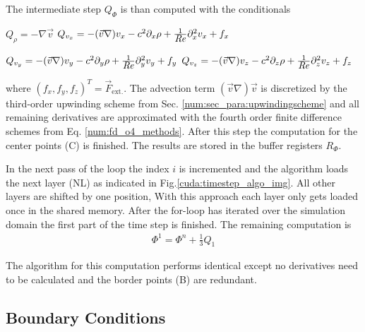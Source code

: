 The intermediate step $Q_{\Phi}$ is than computed with the conditionals
\begin{center}
 \begin{minipage}{.55\linewidth}
\begin{algorithmic}
      \STATE ${Q_{\rho} = -\nabla \vec{v}}$
\ENDIF
{}
      \STATE ${Q_{v_x} = -(\vec{v} \nabla) v_x - c^2\partial_x\rho + \frac{1}{\mbox{\textit{Re}}}\partial^2_xv_x + f_x}$
\ENDIF
\end{algorithmic}
 \end{minipage}

\clearpage

 \begin{minipage}{.55\linewidth}
\begin{algorithmic}
      \STATE ${Q_{v_y} = -(\vec{v} \nabla) v_y - c^2\partial_y\rho + \frac{1}{\mbox{\textit{Re}}}\partial^2_yv_y + f_y}$
\ENDIF
{}
      \STATE ${Q_{v_z} = -(\vec{v} \nabla) v_z - c^2\partial_z\rho + \frac{1}{\mbox{\textit{Re}}}\partial^2_zv_z + f_z}$
\ENDIF
\end{algorithmic}
 \end{minipage}
\end{center}

where $(f_x, f_y, f_z)^T = \vec{F}_{\text{ext.}}$. The advection term $(\vec{v}\nabla)\vec{v}$ is discretized by the third-order upwinding scheme from Sec. \ref{num:sec_para:upwindingscheme}
and all remaining derivatives are approximated with the fourth order finite difference schemes from Eq. \ref{num:fd_o4_methods}.
After this step the computation for the center points (C) is finished.
The results are stored in the buffer registers $R_\Phi$.

In the next pass of the loop the index $i$ is incremented and the algorithm loads the next layer (NL) as indicated in Fig.\ref{cuda:timestep_algo_img}.
All other layers are shifted by one position, With this approach each layer only gets loaded once in the shared memory.
After the for-loop has iterated over the simulation domain the first part of the time step is finished.
The remaining computation is
\begin{align}
     \Phi^{1} = \Phi^n + \frac{1}{3}Q_1
\end{align}

The algorithm for this computation performs identical except no derivatives need to be calculated and
the border points (B) are redundant.

\subsection{Boundary Conditions}
\label{sec:cuda_boundaries}

